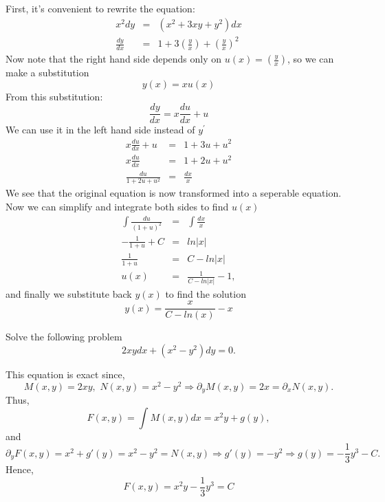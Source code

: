 \documentclass[11pt]{article}
\begin{document}
\begin{solution}
  First, it's convenient to rewrite the equation:
  \begin{eqnarray*}
    x^2 dy & = & \left( x^2 + 3x y + y^2 \right) dx \\
    \frac {dy} {dx} & = & 1 + 3\left( \frac {y} {x} \right)  + \left( \frac {y} {x} \right)^2
  \end{eqnarray*}
  Now note that the right hand side depends only on $u(x) = \left( \frac {y} {x} \right)$,
  so we can make a substitution
  \[ y(x) = x u(x) \]
  From this substitution:
  \[ \frac {dy} {dx} = x \frac {du} {dx} + u \]
  We can use it in the left hand side instead of $y^{\prime}$
  \begin{eqnarray*}
    x \frac {du} {dx} + u & = & 1 + 3 u + u^2 \\
    x \frac {du} {dx} & = & 1 + 2 u + u^2 \\
    \frac {du} {1 + 2u + u^2} & = & \frac {dx} {x}
  \end{eqnarray*}
  We see that the original equation is now transformed into a seperable equation.
  Now we can simplify and integrate both sides to find $u(x)$
  \begin{eqnarray*}
    \int \frac {du} {(1 + u)^2} & = & \int \frac {dx} {x} \\
    - \frac {1} {1 + u} + C & = & ln|x| \\
    \frac {1} {1 + u} & = & C - ln|x| \\
    u(x) & = & \frac {1} {C - ln|x|} - 1,
  \end{eqnarray*}
  and finally we substitute back $y(x)$ to find the solution
  \[ y(x) = \frac {x} {C - ln(x)} - x \]
\end{solution}


\begin{problem}
Solve the following problem
\begin{equation*}
2xy dx+(x^{2}-y^{2})dy=0. 
\end{equation*}
\end{problem}
\begin{solution}
This equation is exact since,
\[M(x,y)=2xy,\,\, N(x,y)= x^{2}-y^{2} \Rightarrow \partial_{y}M(x,y)= 2x = \partial_{x}N(x,y). \]
Thus, 
\[F(x,y)= \int M(x,y) dx = x^{2}y + g(y),\]
and
\[\partial_{y}F(x,y)=x^{2}+g'(y) = x^{2}-y^{2} = N(x,y) \Rightarrow g'(y) = -y^{2} \Rightarrow g(y)= -\frac{1}{3}y^{3}-C.\]
Hence,
\[\boxed{F(x,y)=x^{2}y-\frac{1}{3}y^{3}=C}\]
\end{solution}
\end{document}
